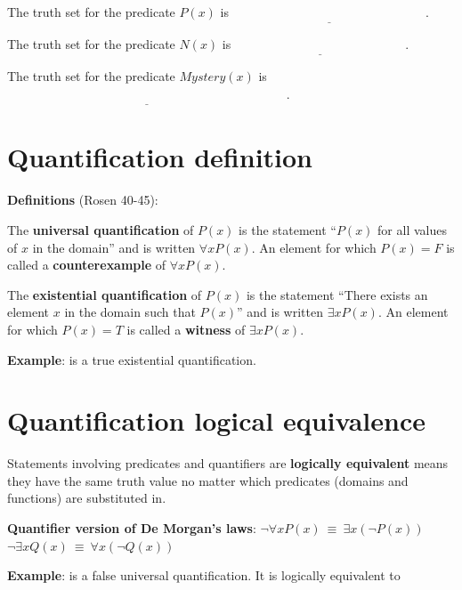 \documentclass[12pt, oneside]{article}
\begin{document}
The truth set for the predicate $P(x)$ is $\underline{\phantom{\{ x ~\mid~ P(x) = T\} = \{ 001, 010, 011 \}}}$.

The truth set for the predicate $N(x)$ is $\underline{\phantom{\{ x ~\mid~ N(x) = T\} = \{ 101, 111 \}}}$.

The truth set for the predicate $Mystery(x)$ is $\underline{\phantom{\{ x ~\mid~ Mystery(x) = T\} = \{ 000, 001, 010, 101, 111 \}}}$.


\vfill \vfill
\section*{Quantification definition}


{\bf Definitions} (Rosen 40-45): 

\vspace{-15pt}

The {\bf universal quantification} of $P(x)$ is the statement ``$P(x)$ for all values of $x$ in the domain''
and is written $\forall x P(x)$. An element for which $P(x) = F$ is called a {\bf counterexample} of $\forall x P(x)$.

The {\bf existential quantification} of $P(x)$ is the statement ``There exists an element $x$ in the domain such that $P(x)$'' and is written $\exists x P(x)$. An element for which $P(x) = T$ is called a {\bf witness} of $\exists x P(x)$.

{\bf Example}: 
\underline{\phantom{$\exists x ~(P(x) \to N(x))$}} is a true existential quantification. \vfill
\section*{Quantification logical equivalence}


Statements involving predicates and quantifiers are {\bf logically equivalent} 
means they have the same truth value no matter which predicates (domains and functions) are substituted in. 

{\bf Quantifier version of De Morgan's laws}: 
$\boxed{\neg \forall x P(x) ~\equiv~ \exists x \left( \neg P(x) \right)}$
\qquad
\qquad
$\boxed{\neg \exists x Q(x) ~\equiv~ \forall x \left( \neg Q(x) \right)}$


{\bf Example}: 
\underline{\phantom{$\forall x ~(P(x) \lor N(x))$}} is a false universal quantification. It is logically equivalent to \underline{\phantom{$\exists x ~\not (P(x) \lor N(x))$}}
\end{document}
